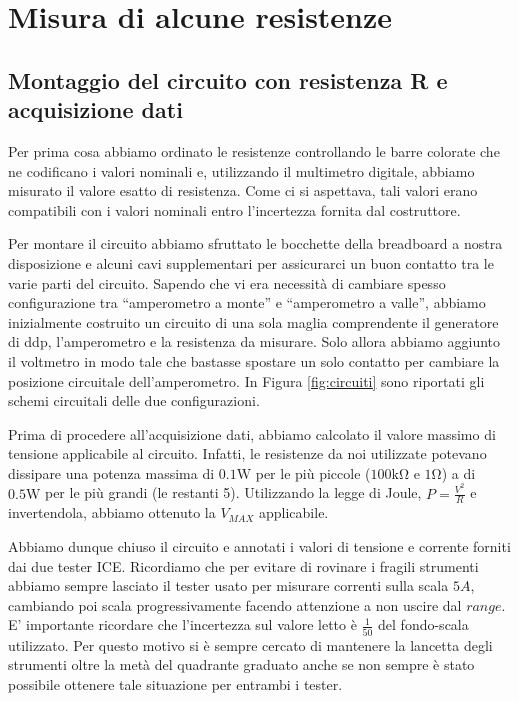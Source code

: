 \section{Misura di alcune resistenze}
\subsection{Montaggio del circuito con resistenza R e acquisizione dati}
Per prima cosa abbiamo ordinato le resistenze controllando le barre colorate che ne codificano  i valori nominali e, utilizzando il multimetro digitale, abbiamo misurato il valore esatto di resistenza. Come ci si aspettava, tali valori erano compatibili con i valori nominali entro l'incertezza fornita dal costruttore.

Per montare il circuito abbiamo sfruttato le bocchette della breadboard a nostra disposizione e alcuni cavi supplementari per assicurarci un buon contatto tra le varie parti del circuito.
Sapendo che vi era necessità di cambiare spesso configurazione tra ``amperometro a monte'' e ``amperometro a valle'', abbiamo inizialmente costruito un circuito di una sola maglia comprendente il generatore di ddp, l'amperometro e la resistenza da misurare. 
Solo allora abbiamo aggiunto il voltmetro in modo tale che bastasse spostare un solo contatto per cambiare la posizione circuitale dell'amperometro. In Figura \ref{fig:circuiti} sono riportati gli schemi circuitali delle due configurazioni.

Prima di procedere all'acquisizione dati, abbiamo calcolato il valore massimo di tensione applicabile al circuito. Infatti, le resistenze da noi utilizzate potevano dissipare una potenza massima di $0.1\si{\watt}$ per le più piccole ($100 \si{\kilo\ohm}$ e $1\si{\ohm}$) a di $0.5\si{\watt}$ per le più grandi (le restanti 5). Utilizzando la legge di Joule, $P=\frac{V^2}{R}$ e invertendola, abbiamo ottenuto la $V_{MAX}$ applicabile. %

Abbiamo dunque chiuso il circuito e annotati i valori di tensione e corrente forniti dai due tester ICE. Ricordiamo che per evitare di rovinare i fragili strumenti abbiamo sempre lasciato il tester usato per misurare correnti sulla scala $5A$, cambiando poi scala progressivamente facendo attenzione a non uscire dal $range$. E' importante ricordare che l'incertezza sul valore letto è $\frac{1}{50}$ del fondo-scala utilizzato. Per questo motivo si è sempre cercato di mantenere la lancetta degli strumenti oltre la metà del quadrante graduato anche se non sempre è stato possibile ottenere tale situazione per entrambi i tester.

